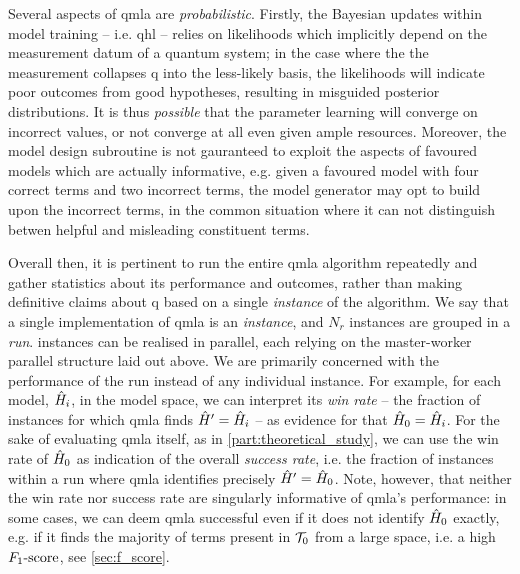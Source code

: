 Several aspects of \gls{qmla} are \emph{probabilistic}.
Firstly, the Bayesian updates within model training -- i.e. \gls{qhl} --
    relies on \glspl{likelihood} which 
    implicitly depend on the measurement datum of a quantum system; 
    in the case where the the measurement collapses \gls{q} into the less-likely basis, 
    the \glspl{likelihood}  will indicate poor outcomes from good hypotheses, 
    resulting in misguided posterior distributions. 
It is thus \emph{possible} that the parameter learning will converge on incorrect values,
    or not converge at all even given ample resources. 
Moreover, the model design subroutine is not gauranteed to exploit the aspects of favoured models which are 
    actually informative, e.g. given a favoured model with four correct terms and two incorrect terms, 
    the model generator may opt to build upon the incorrect terms, in the common situation where it can not distinguish betwen 
    helpful and misleading constituent terms.
\par 

Overall then, 
    it is pertinent to run the entire \gls{qmla} algorithm repeatedly and gather statistics about its performance and outcomes, 
    rather than making definitive claims about \gls{q} based on a single \emph{instance} of the algorithm. 
We say that a single implementation of \gls{qmla} is an \emph{\gls{instance}},
    and $N_r$ \glspl{instance} are grouped in a \emph{\gls{run}}.
\Glspl{instance} can be realised in parallel, 
    each relying on the master-worker parallel structure laid out above. 
We are primarily concerned with the performance of the \gls{run} 
    instead of any individual instance. 
For example,
    for each model, $\hat{H}_i$, in the \gls{model space}, we can interpret its \emph{ \gls{win rate} } 
    -- the fraction of instances for which \gls{qmla} finds $\hat{H}^{\prime}=\hat{H}_i$ -- 
    as evidence for that $\hat{H}_0=\hat{H}_i$.
For the sake of evaluating \gls{qmla} itself, as in \cref{part:theoretical_study}, 
    we can use the  \gls{win rate}  of $\hat{H}_0$ as indication of the overall \emph{\gls{success rate}}, 
    i.e. the fraction of \glspl{instance} within a run where \gls{qmla} identifies precisely $\hat{H}^{\prime} = \hat{H}_0$. 
Note, however, that neither the  \gls{win rate}  nor \gls{success rate} are singularly informative 
    of \gls{qmla}'s performance: in some cases, we can deem \gls{qmla} successful even if it does not 
    identify $\hat{H}_0$ exactly, e.g. if it finds the majority of terms present in $\mathcal{T}_0$ from a large space, 
    i.e. a high $ F_{1}\text{-score} $, see \cref{sec:f_score}. 
\par 

